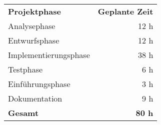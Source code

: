 \begin{tabular}{lr}
\rowcolor{heading}\textbf{Projektphase} & \textbf{Geplante Zeit} \\
Analysephase & 12 h \\
\rowcolor{odd}Entwurfsphase & 12 h \\
Implementierungsphase & 38 h \\
\rowcolor{odd}Testphase & 6 h \\
Einführungsphase & 3 h \\
\rowcolor{odd}Dokumentation & 9 h \\
\hline
\hline
\rowcolor{odd}\textbf{Gesamt} & \textbf{80 h} \\
\end{tabular}



